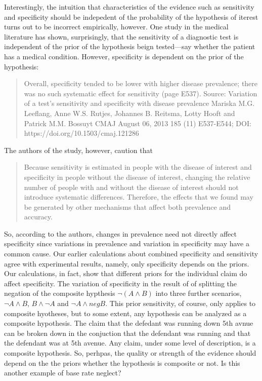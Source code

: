 \documentclass[10pt,dvipsnames,enabledeprecatedfontcommands]{scrartcl}
\begin{document}
Interestingly, the intuition that characteristics of the evidence such
as sensitivity and specificity should be indepedent of the probability
of the hypothesis of iterest turns out to be incorrect empirically,
however. One study in the medical literature has shown, surprisingly,
that the sensitivity of a diagnostic test is independent of the prior of
the hypothesis beign tested---say whether the patient has a medical
condition. However, specificity is dependent on the prior of the
hypothesis:

\begin{quote}
Overall, specificity tended to be
lower with higher disease prevalence; there
was no such systematic effect for sensitivity (page E537).
Source: Variation of a test’s sensitivity and specificity with disease prevalence Mariska M.G. Leeflang, Anne W.S. Rutjes, Johannes B. Reitsma, Lotty Hooft and Patrick M.M. Bossuyt
CMAJ August 06, 2013 185 (11) E537-E544; DOI: https://doi.org/10.1503/cmaj.121286
\end{quote}

\noindent The authors of the study, however, caution that

\begin{quote}
 Because sensitivity is estimated in
people with the disease of interest and specificity
in people without the disease of interest, changing the relative number of people 
with and without the disease of interest should not introduce
systematic differences. Therefore, the effects that
we found may be generated by other mechanisms that affect 
both prevalence and accuracy.
\end{quote}

So, according to the authors, changes in prevalence need not directly
affect specificity since variations in prevalence and variation in
specificity may have a common cause. Our earlier calculations about
combined specificity and sensitivity agree with experimental results,
namely, only specificity depends on the priors. Our calculations, in
fact, show that different priors for the individual claim do affect
specificity. The variation of specificity in the result of of splitting
the negation of the composite hypthesis \(\neg (A \wedge B)\) into three
further scenarios, \(\neg A \wedge B\), \(B \wedge \neg A\) and
\(\neg A \wedge neg B\). This prior sensitivity, of course, only applies
to composite hyotheses, but to some extent, any hypothesis can be
analyzed as a composite hypothesis. The claim that the defedant was
running down 5th avnue can be broken down in the conjuction that the
defendant was running and that the defendant was at 5th avenue. Any
claim, under some level of description, is a composite hypothesis. So,
perhpas, the quality or strength of the evidence should depend on the
the priors whether the hypothesis is composite or not. Is this another
example of base rate neglect?
\end{document}

